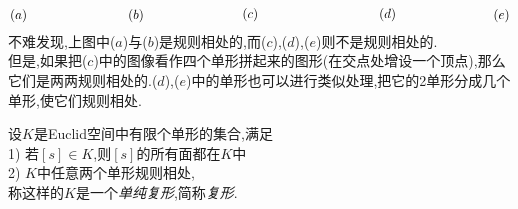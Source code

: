 \documentclass{article}
\begin{document}
\[\begin{tikzpicture}[x=0.75pt,y=0.75pt,yscale=-1,xscale=1]
\draw (67.12,225.4) node [anchor=north west][inner sep=0.75pt]    {$( a)$};
\draw (188,225.4) node [anchor=north west][inner sep=0.75pt]    {$( b)$};
\draw (305,224.4) node [anchor=north west][inner sep=0.75pt]    {$( c)$};
\draw (445,224.4) node [anchor=north west][inner sep=0.75pt]    {$( d)$};
\draw (562,225.4) node [anchor=north west][inner sep=0.75pt]    {$( e)$};
\end{tikzpicture}\]
不难发现,上图中($a$)与($b$)是规则相处的,而($c$),($d$),($e$)则不是规则相处的.\\
但是,如果把($c$)中的图像看作四个单形拼起来的图形(在交点处增设一个顶点),那么它们是两两规则相处的.($d$),($e$)中的单形也可以进行类似处理,把它的2单形分成几个单形,使它们规则相处.
\begin{definition}
    设$K$是Euclid空间中有限个单形的集合,满足\\
    1) 若$[s]\in K$,则$[s]$的所有面都在$K$中\\
    2) $K$中任意两个单形规则相处,\\
    称这样的$K$是一个\emph{单纯复形},简称\emph{复形}.
\end{definition}
\end{document}
